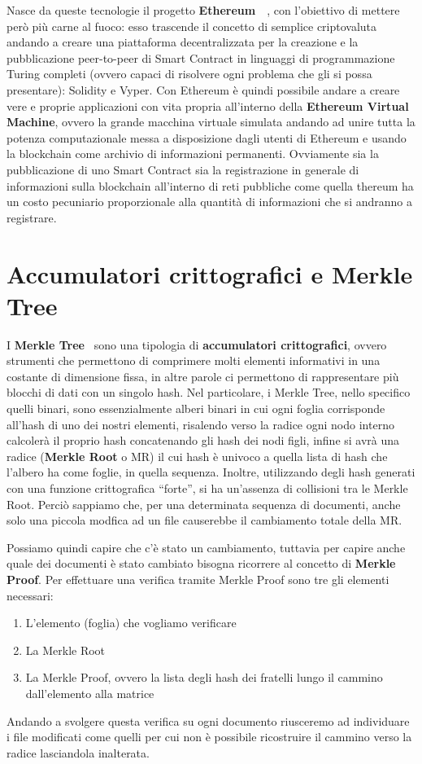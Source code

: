 \label{sub:eth}
Nasce da queste tecnologie il progetto \textbf{Ethereum}~\cite{eth-21}~\cite{eth-22}, con l’obiettivo di mettere però
più carne al fuoco: esso trascende il concetto di semplice criptovaluta andando a creare
una piattaforma decentralizzata per la creazione e la pubblicazione peer-to-peer di Smart Contract
in linguaggi di programmazione Turing completi (ovvero capaci di risolvere ogni problema
che gli si possa presentare): Solidity e Vyper.
Con Ethereum è quindi possibile andare a creare vere e proprie applicazioni
con vita propria all’interno della \textbf{Ethereum Virtual Machine},
ovvero la grande macchina virtuale simulata andando ad unire tutta la potenza computazionale
messa a disposizione dagli utenti di Ethereum e usando la blockchain come archivio di
informazioni permanenti. Ovviamente sia la pubblicazione di uno Smart Contract sia la registrazione
in generale di informazioni sulla blockchain all’interno di reti pubbliche come quella
thereum ha un costo pecuniario proporzionale alla quantità di informazioni che si andranno a registrare.

\section{Accumulatori crittografici e Merkle Tree}
\label{sub:mt}
I \textbf{Merkle Tree}~\cite{mertree} sono una tipologia di \textbf{accumulatori crittografici}, ovvero strumenti che permettono
di comprimere molti elementi informativi in una costante di dimensione fissa, in altre parole
ci permettono di rappresentare più blocchi di dati con un singolo hash.
Nel particolare, i Merkle Tree, nello specifico quelli binari, sono essenzialmente alberi binari
in cui ogni foglia corrisponde all’hash di uno dei nostri elementi, risalendo verso la radice ogni
nodo interno calcolerà il proprio hash concatenando gli hash dei nodi figli, infine si avrà
una radice (\textbf{Merkle Root} o MR) il cui hash è univoco a quella lista di hash che l’albero
ha come foglie, in quella sequenza.
Inoltre, utilizzando degli hash generati con una funzione crittografica “forte”, si ha
un’assenza di collisioni tra le Merkle Root.
Perciò sappiamo che, per una determinata sequenza di documenti, anche solo una
piccola modfica ad un file causerebbe il cambiamento totale della MR.

Possiamo quindi capire che c’è stato un cambiamento, tuttavia per capire anche
quale dei documenti è stato cambiato bisogna ricorrere al concetto di \textbf{Merkle Proof}.
Per effettuare una verifica tramite Merkle Proof sono tre gli elementi necessari:
\begin{enumerate}
    \item L’elemento (foglia) che vogliamo verificare
    \item La Merkle Root
    \item La Merkle Proof, ovvero la lista degli hash dei fratelli lungo il cammino dall’elemento alla matrice
\end{enumerate}
Andando a svolgere questa verifica su ogni documento riusceremo ad individuare i file modificati come
quelli per cui non è possibile ricostruire il cammino verso la radice lasciandola inalterata.


